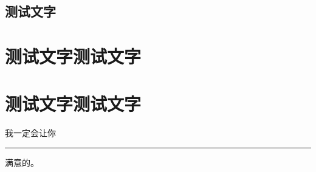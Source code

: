 \documentclass[themecolor=iris]{textbook-cn}%
\begin{document}
\lipsum
%
%
%
\chapter{测试文字}







{
\FontSizeSet[1.0]{14pt}
\zhlipsum[2]
}

\partintro{\lipsum[2]}
\part*{测试文字测试文字}

\zhlipsum
%
%
\partsubtitle{ }
\partintro{\lipsum[2]}
\part*{测试文字测试文字}
%
\zhlipsum


我一定会让你 \leaders\hrule height -2.6pt depth 3pt \hskip 3.0cm 满意的。
\end{document}
